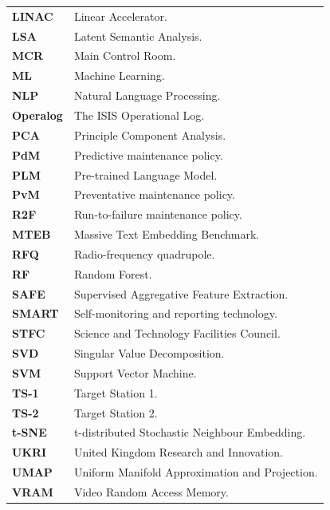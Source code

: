 \documentclass[10pt,oneside]{report}
\begin{document}
\begin{table}[ht]
\begin{tabular}{ll}
        \textbf{LINAC} & Linear Accelerator. \\
        \textbf{LSA} & Latent Semantic Analysis. \\
        \textbf{MCR} & Main Control Room. \\
        \textbf{ML} & Machine Learning. \\
        \textbf{NLP} & Natural Language Processing. \\
        \textbf{Operalog} & The ISIS Operational Log. \\
        \textbf{PCA} & Principle Component Analysis. \\
        \textbf{PdM} & Predictive maintenance policy. \\
        \textbf{PLM} & Pre-trained Language Model. \\
        \textbf{PvM} & Preventative maintenance policy. \\
        \textbf{R2F} & Run-to-failure maintenance policy. \\
        \textbf{MTEB} & Massive Text Embedding Benchmark. \\
        \textbf{RFQ} & Radio-frequency quadrupole. \\
        \textbf{RF} & Random Forest. \\
        \textbf{SAFE} & Supervised Aggregative Feature Extraction. \\
        \textbf{SMART} & Self-monitoring and reporting technology. \\
        \textbf{STFC} & Science and Technology Facilities Council. \\
        \textbf{SVD} & Singular Value Decomposition. \\
        \textbf{SVM} & Support Vector Machine. \\
        \textbf{TS-1} & Target Station 1. \\
        \textbf{TS-2} & Target Station 2. \\
        \textbf{t-SNE} & t-distributed Stochastic Neighbour Embedding. \\
        \textbf{UKRI} & United Kingdom Research and Innovation. \\
        \textbf{UMAP} & Uniform Manifold Approximation and Projection. \\
        \textbf{VRAM} & Video Random Access Memory. \\

    \end{tabular}
\end{table}
\end{document}

